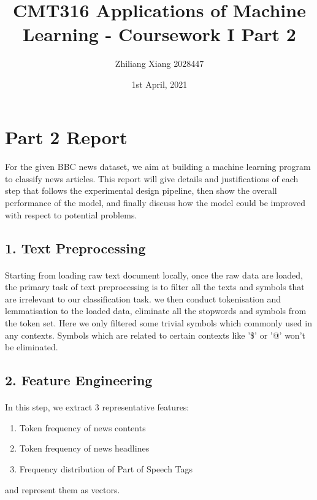 \documentclass{article}
\title{\textbf{CMT316 Applications of Machine Learning - Coursework I Part 2}}
\date{1st April, 2021}
\author{Zhiliang Xiang 2028447}
\begin{document}
\maketitle
{}
\newpage
{}
\section*{Part 2 Report}
\paragraph{}
For the given BBC news dataset\cite{4}, we aim at building a machine learning program to classify news articles. This report will give details and justifications of each step that follows the experimental design pipeline, then show the overall performance of the model, and finally discuss how the model could be improved with respect to potential problems.
\subsection*{1. Text Preprocessing}
\paragraph{}
Starting from loading raw text document locally, once the raw data are loaded, the primary task of text preprocessing is to filter all the texts and symbols that are irrelevant to our classification task. we then conduct tokenisation and lemmatisation to the loaded data, eliminate all the stopwords and symbols from the token set. Here we only filtered some trivial symbols which commonly used in any contexts. Symbols which are related to certain contexts like '\$' or '@' won't be eliminated.
\subsection*{2. Feature Engineering} 
\paragraph{}
In this step, we extract 3 representative features:
\begin{enumerate}	
		\item  Token frequency of news contents
		\item  Token frequency of news headlines
		\item  Frequency distribution of Part of Speech Tags	
\end{enumerate}
and represent them as vectors.
\end{document}
